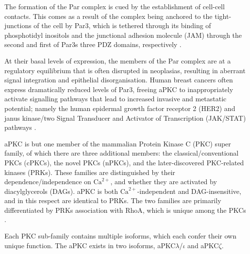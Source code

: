The formation of the Par complex is cued by the establishment of cell-cell
contacts. This comes as a result of the complex being anchored to the tight-
junctions of the cell by Par3, which is tethered through its binding of
phosphotidyl inositols and the junctional adhesion molecule (JAM) through the
second and first of Par3s three PDZ domains, respectively \citep{wu2007,ebnet2001}.\par

At their basal levels of expression, the members of the Par complex are at a
regulatory equilibrium that is often disrupted in neoplasias, resulting in
aberrant signal integration and epithelial disorganisation. Human breast
cancers often express dramatically reduced levels of Par3, freeing aPKC to
inappropriately activate signalling pathways that lead to increased invasive and
metastatic potential; namely the human epidermal growth factor receptor 2 (HER2)
and janus kinase/two Signal Transducer and Activator of Transcription (JAK/STAT)
pathways \citep{xue2013,mccaffrey2012}.\par

aPKC is but one member of the mammalian Protein Kinase C (PKC) super family, of
which there are three additional members: the classical/conventional PKCs
(cPKCs), the novel PKCs (nPKCs), and the later-discovered PKC-related kinases
(PRKs). These families are distinguished by their dependence/independence
on $\textrm{Ca}^{2+}$, and whether they are activated by diacylglycerols (DAGs). aPKC is both $\textrm{Ca}^{2+}$-independent and DAG-insensitive, and in this respect are identical to PRKs.
The two families are primarily differentiated by PRKs association with RhoA,
which is unique among the PKCs \citep{mellor1998}.\par

Each PKC sub-family contains multiple isoforms, which each confer their own
unique function. The aPKC exists in two isoforms, aPKC$\lambda$/$\iota$ and aPKC$\zeta$.\par

